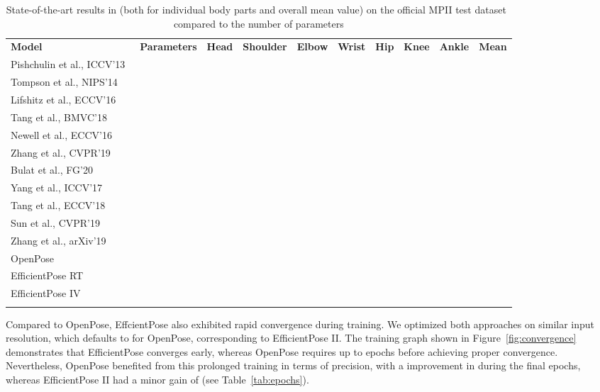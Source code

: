 \begin{table*}
\centering
\caption{State-of-the-art results in  (both for individual body parts and overall mean value) on the official MPII test dataset~\cite{andriluka14cvpr} compared to the number of parameters}
\label{tab:mpiitest}       
\begin{tabular}{llllllllll}
\hline\noalign{\smallskip}
\textbf{Model} & \textbf{Parameters} & \textbf{Head} & \textbf{Shoulder} & \textbf{Elbow} & \textbf{Wrist} & \textbf{Hip} & \textbf{Knee} & \textbf{Ankle} & \textbf{Mean}  \\
\noalign{\smallskip}\hline\noalign{\smallskip}
Pishchulin et al., ICCV’13~\cite{pishchulin2013poselet} &  &  &  &  &  &  &  &  &  \\
Tompson et al., NIPS’14~\cite{tompson2014joint} &  &  &  &  &  &  &  &  &  \\
Lifshitz et al., ECCV’16~\cite{lifshitz2016human} &  &  &  &  &  &  &  &  &  \\
Tang et al., BMVC'18~\cite{tang2018cu} &  &  &  &  &  &  &  &  &  \\
Newell et al., ECCV’16~\cite{newell2016stacked} &  &  &  &  &  &  &  &  &  \\
Zhang et al., CVPR’19~\cite{zhang2019fast} &  &  &  &  &  &  &  &  &  \\
Bulat et al., FG'20~\cite{bulat2020toward} &  &  &  &  &  &  &  &  &  \\
Yang et al., ICCV’17~\cite{yang2017learning} &  &  &  &  &  &  &  &  &  \\
Tang et al., ECCV’18~\cite{tang2018deeply} &  &  &  &  &  &  &  &  &  \\
Sun et al., CVPR’19~\cite{sun2019deep} &  &  &  &  &  &  &  &  &  \\
Zhang et al., arXiv’19~\cite{zhang2019human} &  &  &  &  &  &  &  &  &  \\
\noalign{\smallskip}\hline\noalign{\smallskip}
OpenPose~\cite{cao2018openpose} &  &  &  &  &  &  &  &  &  \\
EfficientPose RT &  &  &  &  &  &  &  &  &  \\
EfficientPose IV &  &  &  &  &  &  &  &  &  \\
\noalign{\smallskip}\hline
\end{tabular}
\end{table*}

Compared to OpenPose, EffcientPose also exhibited rapid convergence during training. We optimized both approaches on similar input resolution, which defaults to  for OpenPose, corresponding to EfficientPose II. The training graph shown in Figure~\ref{fig:convergence} demonstrates that EfficientPose converges early, whereas OpenPose requires up to  epochs before achieving proper convergence. Nevertheless, OpenPose benefited from this prolonged training in terms of precision, with a  improvement in  during the final  epochs, whereas EfficientPose II had a minor gain of  (see Table~\ref{tab:epochs}).

